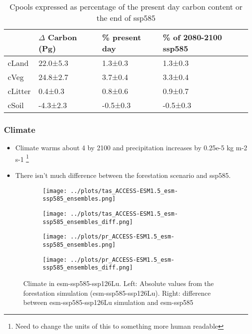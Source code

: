 \documentclass[]{article}
\begin{document}
\begin{table}[H]
    \centering
    \begin{tabular}{@{}llll@{}}
    \hline
        & $\Delta$ Carbon (Pg) & \% present day & \% of 2080-2100 ssp585 \\ \hline
cLand   & 22.0±5.3    & 1.3±0.3        & 1.3±0.3                \\
cVeg    & 24.8±2.7    & 3.7±0.4        & 3.3±0.4                \\
cLitter & 0.4±0.3     & 0.8±0.6        & 0.9±0.7                \\
cSoil   & -4.3±2.3    & -0.5±0.3       & -0.5±0.3               \\ \hline
    \end{tabular}
    \caption{Cpools expressed as percentage of the present day carbon content or the end of ssp585}
    \label{tab:cpools_table}
\end{table}

\subsubsection{Climate}

\begin{itemize}
    \item Climate warms about 4 \textcelsius{} by 2100 and precipitation increases by 0.25e-5 kg m-2 s-1 \footnote{Need to change the units of this to something more human readable}
    \item There isn't much difference between the forestation scenario and ssp585.
\end{itemize}

\begin{figure}[H]
    \centering
    \begin{subfigure}[b]{0.45\linewidth}
        \texttt{[image: ../plots/tas\_ACCESS-ESM1.5\_esm-ssp585\_ensembles.png]}
    \end{subfigure}
    \begin{subfigure}[b]{0.45\linewidth}
        \texttt{[image: ../plots/tas\_ACCESS-ESM1.5\_esm-ssp585\_ensembles\_diff.png]}
    \end{subfigure}
    \begin{subfigure}[b]{0.45\linewidth}
        \texttt{[image: ../plots/pr\_ACCESS-ESM1.5\_esm-ssp585\_ensembles.png]}
    \end{subfigure}
    \begin{subfigure}[b]{0.45\linewidth}
        \texttt{[image: ../plots/pr\_ACCESS-ESM1.5\_esm-ssp585\_ensembles\_diff.png]}
    \end{subfigure}
    \caption{Climate in esm-ssp585-ssp126Lu. Left: Absolute values from the forestation simulation (esm-ssp585-ssp126Lu). Right: difference between esm-ssp585-ssp126Lu simulation and esm-ssp585}
    \label{fig:climate}
\end{figure}
\end{document}
